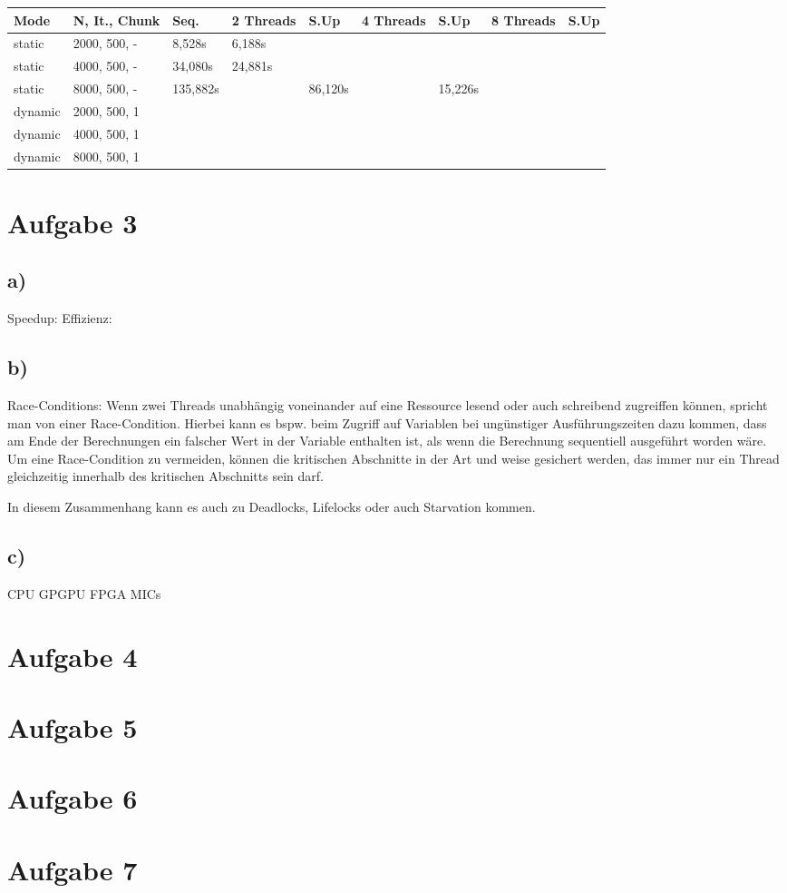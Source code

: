 \documentclass{article}
\begin{document}
			\begin{tabular}{|p{1cm}|p{2cm}|p{1cm}|p{1cm}|p{1cm}|p{1cm}|p{1cm}|p{1cm}|p{1cm}|}
				\hline
				Mode & N, It., Chunk & Seq. & 2 Threads & S.Up & 4 Threads & S.Up & 8 Threads & S.Up \\
				\hline
				static & 2000, 500, - & 8,528s & 6,188s & & & & \\
				static & 4000, 500, - & 34,080s & 24,881s & & & & \\
				static & 8000, 500, - & 135,882s &  & 86,120s &  & 15,226s & \\
				dynamic & 2000, 500, 1 & & & & & & \\
				dynamic & 4000, 500, 1 & & & & & & \\
				dynamic & 8000, 500, 1 & & & & & & \\
			\end{tabular}

    \section{Aufgabe 3}
        \subsection{a)}
        Speedup:
        Effizienz:
        \subsection{b)}
        Race-Conditions: Wenn zwei Threads unabhängig voneinander auf eine Ressource lesend oder auch schreibend zugreiffen können, 
        spricht man von einer Race-Condition. Hierbei kann es bspw. beim Zugriff auf Variablen bei ungünstiger Ausführungszeiten
        dazu kommen, dass am Ende der Berechnungen ein falscher Wert in der Variable enthalten ist, als wenn die Berechnung sequentiell 
        ausgeführt worden wäre.
        Um eine Race-Condition zu vermeiden, können die kritischen Abschnitte in der Art und weise gesichert werden, das immer nur ein 
        Thread gleichzeitig innerhalb des kritischen Abschnitts sein darf.

        In diesem Zusammenhang kann es auch zu Deadlocks, Lifelocks oder auch Starvation kommen. 
        \subsection{c)}
        CPU
        GPGPU
        FPGA
        MICs

    \section{Aufgabe 4}

    \section{Aufgabe 5}

\section{Aufgabe 6}

\section{Aufgabe 7}
\end{document}
